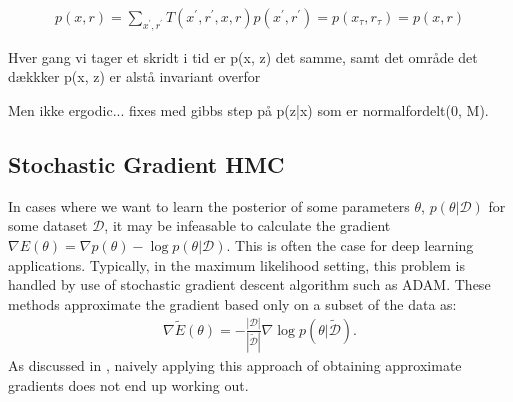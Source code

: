 \begin{align*}
    p(x, r) = \sum_{x^\prime, r^\prime} T(x^\prime, r^\prime, x, r) p(x^\prime, r^\prime) = p(x_\tau, r_\tau) =  p(x, r)
\end{align*}


Hver gang vi tager et skridt i tid er p(x, z) det samme, samt det område det dækkker   p(x, z) er alstå invariant overfor 

Men ikke ergodic... fixes med gibbs step på p(z|x) som er normalfordelt(0, M).


    
\subsection{Stochastic Gradient HMC}

In cases where we want to learn the posterior of some parameters $\theta$,  $p(\theta | \mathcal{D})$ for some dataset $\mathcal{D}$, it may be infeasable to calculate the gradient $\nabla E(\theta) = \nabla p(\theta) - \log{p(\theta | \mathcal{D})}$. 
This is often the case for deep learning applications.
Typically, in the maximum likelihood setting, this problem is handled by use of stochastic gradient descent algorithm such as ADAM. These methods approximate the gradient based only on a subset of the data as:
\begin{align*}
    \nabla\tilde{E}(\theta) = -\frac{|\mathcal{D}|}{|\tilde{\mathcal{D}}|}  \nabla \log{p(\theta | \tilde{\mathcal{D}})}.
\end{align*}
As discussed in \cite{chen_stochastic_2014}, naively applying this approach of obtaining approximate gradients does not end up working out.

